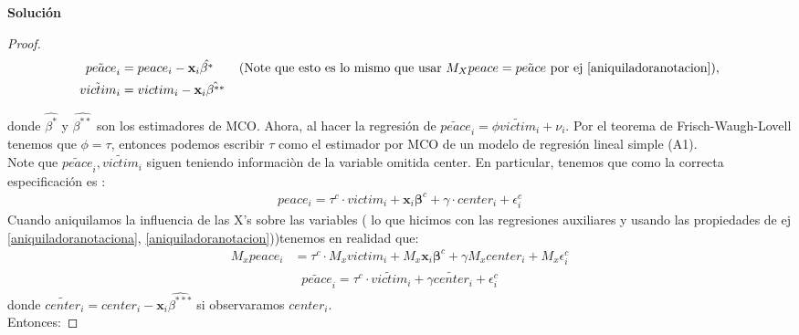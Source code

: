 \documentclass[a4paper, answers, addpoints, 11pt]{exam}
\newenvironment{solucion}{%
  \begin{mdframed}[
    backgroundcolor=blue!5,    %
    linecolor=blue!50,          %
    linewidth=2pt,              %
    leftmargin=10pt,            %
    rightmargin=8pt,           %
    topline=true,              %
    bottomline=true,            %
    roundcorner=10pt,           %
    innerleftmargin=10pt,       %
    innerrightmargin=10pt,      %
    innerbottommargin=10pt,     %
    innertopmargin=10pt         %
  ]%
  \begin{tcolorbox}[colframe=blue!50!black, colback=blue!50, coltitle=white, sharp corners=all, boxrule=1mm, width=\textwidth, halign=left, valign=center, top=0mm, bottom=0mm, left=0mm, right=0mm] \textbf{Solución} \end{tcolorbox} }{\end{mdframed}}
\begin{document}
\begin{enumerate} [resume]
\begin{solucion}
\begin{proof}
\begin{align*}
    \tilde{peace}_i &= peace_i - \textbf{x}_i \hat{\beta^{*}} \qquad \text{(Note que esto es lo mismo que usar $M_X peace= \tilde{peace}$ por ej \ref{aniquiladoranotacion})}, \\
    \tilde{victim}_i &= victim_i - \textbf{x}_i \hat{\beta^{**}} 
\end{align*}

\noindent donde \( \hat{\beta^{*}} \) y \( \hat{\beta^{**}} \) son los estimadores de MCO. Ahora, al hacer la regresión de $\tilde{peace}_i= \phi \tilde{victim}_i+\nu_i $. Por el teorema de Frisch-Waugh-Lovell tenemos que $\phi = \tau$, entonces podemos escribir $\tau$ como el estimador por MCO de un modelo de regresión lineal simple (A1).\\

Note que $\tilde{peace}_i, \tilde{victim}_i$ siguen teniendo informaciòn de la variable omitida center. En particular, tenemos que como la correcta especificación es : 
    \begin{gather*}
         peace_i = \tau^{c} \cdot victim_i + \textbf{x}_i\boldsymbol\beta^{c} + \gamma \cdot center_i + \epsilon^{c}_i
         \end{gather*}
   Cuando aniquilamos la influencia de las X's sobre las variables ( lo que hicimos con las regresiones auxiliares y usando las propiedades de ej \ref{aniquiladoranotaciona}, \ref{aniquiladoranotacion}))tenemos en realidad que:
     \begin{align*}
        M_x peace_i &= \tau^{c} \cdot M_x victim_i + M_x \textbf{x}_i\boldsymbol\beta^{c} + \gamma  M_x center_i + M_x\epsilon^{c}_i 
     \end{align*}
   \begin{gather}\label{aniquilacionx}
        \tilde{peace}_i = \tau^{c} \cdot \tilde{victim}_i +  \gamma  \tilde{center}_i + \epsilon^{c}_i 
    \end{gather}
    donde $\tilde{center}_i=center_i - \textbf{x}_i \hat{\beta^{***}}$ si observaramos $center_i$.\\
       
    

Entonces:


\end{proof}
\end{solucion}
\end{enumerate}
\end{document}
